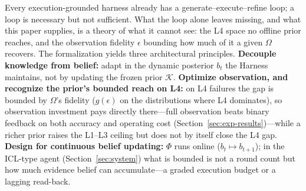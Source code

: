 Every execution-grounded harness already has a generate--execute--refine loop; a loop is necessary but not sufficient. What the loop alone leaves missing, and what this paper supplies, is a theory of what it cannot see: the L4 space no offline prior reaches, and the observation fidelity $\epsilon$ bounding how much of it a given $\Omega$ recovers. The formalization yields three architectural principles.
\textbf{Decouple knowledge from belief:} adapt in the dynamic posterior $b_t$ the Harness maintains, not by updating the frozen prior $\mathcal{K}$.
\textbf{Optimize observation, and recognize the prior's bounded reach on L4:} on L4 failures the gap is bounded by $\Omega$'s fidelity ($g(\epsilon)$ on the distributions where L4 dominates), so observation investment pays directly there---full observation beats binary feedback on both accuracy and operating cost (Section~\ref{sec:exp-results})---while a richer prior raises the L1--L3 ceiling but does not by itself close the L4 gap.
\textbf{Design for continuous belief updating:} $\Phi$ runs online ($b_t\mapsto b_{t+1}$); in the ICL-type agent (Section~\ref{sec:system}) what is bounded is not a round count but how much evidence belief can accumulate---a graded execution budget or a lagging read-back.
